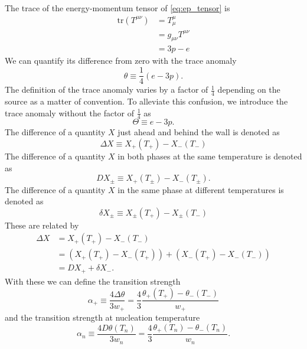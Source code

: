 The trace of the energy-momentum tensor of \eqref{eq:ep_tensor} is
\begin{align}
\text{tr} (T^{\mu \nu})
&= T^\mu_\mu \\
&= g_{\mu \nu} T^{\mu \nu} \\
&=3p - e
\end{align}
We can quantify its difference from zero with the trace anomaly
\cites[eq. 7.24]{lecture_notes}[eq. 28]{giese_2020}
\begin{equation}
\theta \equiv \frac{1}{4}(e-3p).
\label{eq:theta}
\end{equation}
The definition of the trace anomaly varies by a factor of $\frac{1}{4}$ depending on the source as a matter of convention.
To alleviate this confusion, we introduce the trace anomaly without the factor of $\frac{1}{4}$ as
\begin{equation}
\Theta \equiv e - 3p.
\label{eq:theta_big}
\end{equation}
The difference of a quantity $X$ just ahead and behind the wall is denoted as
\begin{equation}
\Delta X
\equiv X_+(T_+) - X_-(T_-) %
\end{equation}
The difference of a quantity $X$ in both phases at the same temperature is denoted as
\begin{equation}
DX_\pm \equiv X_+(T_\pm) - X_-(T_\pm).
\end{equation}
The difference of a quantity $X$ in the same phase at different temperatures is denoted as
\begin{equation}
\delta X_\pm \equiv X_\pm(T_+) - X_\pm(T_-)
\end{equation}
These are related by
\begin{align}
\Delta X
&= X_+(T_+) - X_-(T_-) \\
&= \left( X_+(T_+) - X_-(T_+) \right) + \left( X_-(T_+) - X_-(T_-) \right) \\
&= DX_+ + \delta X_-.
\label{eq:delta_relation}
\end{align}
With these we can define the transition strength
\begin{equation}
\alpha_+
\equiv \frac{4 \Delta \theta}{3 w_+}
= \frac{4}{3} \frac{\theta_+(T_+) - \theta_-(T_-)}{w_+}
\label{eq:alpha_plus}
\end{equation}
and the transition strength at nucleation temperature
\cite[eq. 2.11]{hindmarsh_gw_pt_2019}
\begin{equation}
\alpha_n
\equiv \frac{4D\theta(T_n)}{3w_n}
= \frac{4}{3} \frac{\theta_+(T_n) - \theta_-(T_n)}{w_n}.
\label{eq:alpha_n}
\end{equation}
